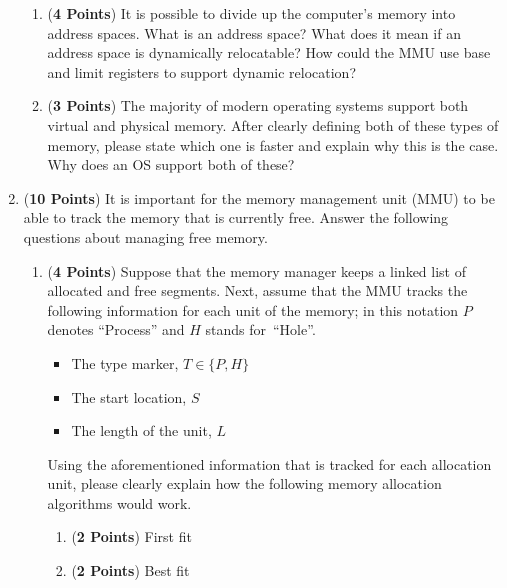 \documentclass[12pt,epsf,psfig,graphics]{article}
\begin{document}
\begin{enumerate}
\begin{enumerate}
    \item ({\bf 4 Points}) It is possible to divide up the computer's memory into address spaces.  What is an address
      space?  What does it mean if an address space is dynamically relocatable? How could the MMU use base and limit
      registers to support dynamic relocation?   

    \item ({\bf 3 Points}) The majority of modern operating systems support both virtual and physical memory.  After
      clearly defining both of these types of memory, please state which one is faster and explain why this is the case.
      Why does an OS support both of these?

  \end{enumerate}
        
\newpage

% 
\item ({\bf 10 Points}) It is important for the memory management unit (MMU) to be able to track the memory that is
  currently free.  Answer the following questions about managing free memory.

  \begin{enumerate}
          
  \item ({\bf 4 Points}) Suppose that the memory manager keeps a linked list of allocated and free segments.  Next,
    assume that the MMU tracks the following information for each unit of the memory; in this notation $P$
    denotes ``Process'' and $H$ stands \mbox{for ``Hole''}.

    \begin{itemize}
      \item The type marker, $T \in \{P, H\}$
      \item The start location, $S$
      \item The length of the unit, $L$
    \end{itemize}

    Using the aforementioned information that is tracked for each allocation unit, please clearly explain how the
    following memory allocation algorithms would work.

    \begin{enumerate}
      \item ({\bf 2 Points}) First fit
      \item ({\bf 2 Points}) Best fit
    \end{enumerate}


\end{enumerate}
\end{enumerate}
\end{document}
